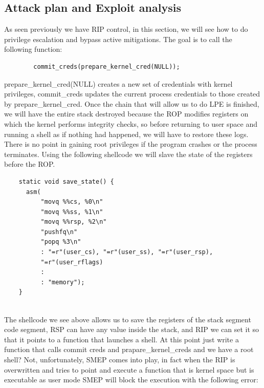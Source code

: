     \subsection{Attack plan and Exploit analysis}
    As seen previously we have RIP control, in this section, we will see how to do privilege escalation and bypass active mitigations.\newline
    The goal is to call the following function:\newline
    \begin{verbatim}
        commit_creds(prepare_kernel_cred(NULL));
    \end{verbatim}
prepare\_kernel\_cred(NULL) creates a new set of credentials with kernel privileges, commit\_creds updates the current process credentials to those created by prepare\_kernel\_cred.\newline
    Once the chain that will allow us to do LPE is finished, we will have the entire stack destroyed because the ROP modifies registers on which the kernel performs integrity checks, so before returning to user space and running a shell as if nothing had happened, we will have to restore these logs.\newline
    There is no point in gaining root privileges if the program crashes or the process terminates.\newline
   Using the following shellcode we will slave the state of the registers before the ROP.\newline
    \begin{verbatim}
    static void save_state() {
      asm(
          "movq %%cs, %0\n"
          "movq %%ss, %1\n"
          "movq %%rsp, %2\n"
          "pushfq\n"
          "popq %3\n"
          : "=r"(user_cs), "=r"(user_ss), "=r"(user_rsp), 
          "=r"(user_rflags)
          :
          : "memory");
    }
    
    \end{verbatim}
    The shellcode we see above allows us to save the registers of the stack segment code segment, RSP can have any value inside the stack, and RIP we can set it so that it points to a function that launches a shell.\newline
    At this point just write a function that calls commit creds and prapare\_kernel\_creds and we have a root shell?\newline
    Not, unfortunately, SMEP comes into play, in fact when the RIP is overwritten and tries to point and execute a function that is kernel space but is executable as user mode SMEP will block the execution with the following error:
